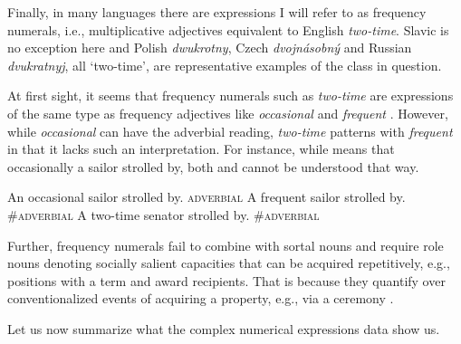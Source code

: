 \documentclass[output=paper]{langscibook}
\begin{document}
	Finally, in many languages there are expressions I will refer to as frequency numerals, i.e., multiplicative adjectives equivalent to English \textit{two-time}. Slavic is no exception here and Polish \textit{dwukrotny}, Czech \textit{dvojnásobný} and Russian \textit{dvukratnyj}, all `two-time', are representative examples of the class in question. 
	
	At first sight, it seems that frequency numerals such as \textit{two-time} are expressions of the same type as frequency adjectives like \textit{occasional} and \textit{frequent} \citep{zimmermann2003pluractionality,schafer2007frequency,gehrke_mcnally2015distributional}. However, while \textit{occasional} can have the adverbial reading, \textit{two-time} patterns with \textit{frequent} in that it lacks such an interpretation. For instance, while  means that occasionally a sailor strolled by, both  and  cannot be understood that way.

	\ea \ea An occasional sailor strolled by. \hfill {}\textsc{adverbial}\label{ex:frequency-adjectives-occasional}
	\ex A frequent sailor strolled by. \hfill \#\textsc{adverbial}\label{ex:frequency-adjectives-frequent} 
	\ex A two-time senator strolled by. \hfill \#\textsc{adverbial}\label{ex:multiplicatives-two-time}
	\z
	\z
	
	\noindent Further, frequency numerals fail to combine with sortal nouns and require role nouns denoting socially salient capacities that can be acquired repetitively, e.g., positions with a term and award recipients. That is because they quantify over conventionalized events of acquiring a property, e.g., via a ceremony .
	
	\ea \label{ex:polish-multiplicatives} 
	\z
	\z

\noindent Let us now summarize what the complex numerical expressions data show us.
	
\end{document}
